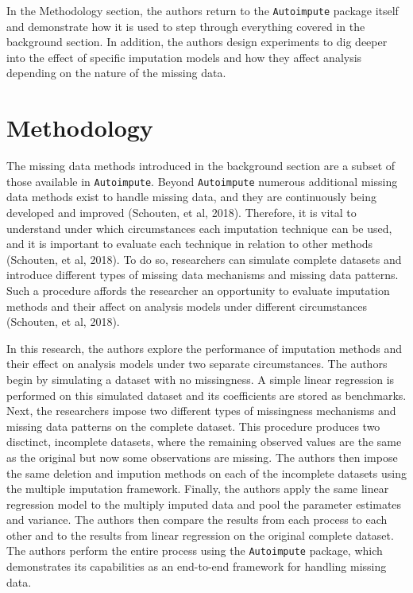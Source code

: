 \documentclass[12pt,oneside]{chicagocapstone}
\begin{document}
In the Methodology section, the authors return to the
\texttt{Autoimpute} package itself and demonstrate how it is used to
step through everything covered in the background section. In addition,
the authors design experiments to dig deeper into the effect of specific
imputation models and how they affect analysis depending on the nature
of the missing data.

\hypertarget{methodology}{\chapter*{Methodology}\label{methodology}}

The missing data methods introduced in the background section are a
subset of those available in \texttt{Autoimpute}. Beyond
\texttt{Autoimpute} numerous additional missing data methods exist to
handle missing data, and they are continuously being developed and
improved (Schouten, et al, 2018). Therefore, it is vital to understand
under which circumstances each imputation technique can be used, and it
is important to evaluate each technique in relation to other methods
(Schouten, et al, 2018). To do so, researchers can simulate complete
datasets and introduce different types of missing data mechanisms and
missing data patterns. Such a procedure affords the researcher an
opportunity to evaluate imputation methods and their affect on analysis
models under different circumstances (Schouten, et al, 2018).

In this research, the authors explore the performance of imputation
methods and their effect on analysis models under two separate
circumstances. The authors begin by simulating a dataset with no
missingness. A simple linear regression is performed on this simulated
dataset and its coefficients are stored as benchmarks. Next, the
researchers impose two different types of missingness mechanisms and
missing data patterns on the complete dataset. This procedure produces
two disctinct, incomplete datasets, where the remaining observed values
are the same as the original but now some observations are missing. The
authors then impose the same deletion and impution methods on each of
the incomplete datasets using the multiple imputation framework.
Finally, the authors apply the same linear regression model to the
multiply imputed data and pool the parameter estimates and variance. The
authors then compare the results from each process to each other and to
the results from linear regression on the original complete dataset. The
authors perform the entire process using the \texttt{Autoimpute}
package, which demonstrates its capabilities as an end-to-end framework
for handling missing data.
\end{document}
